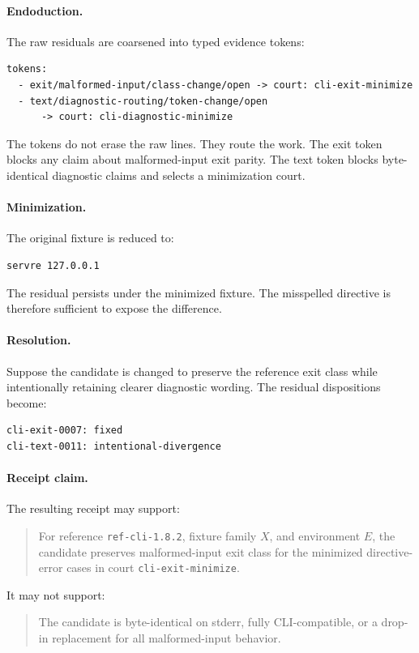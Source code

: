 \documentclass[11pt,a4paper]{article}
\begin{document}
\paragraph{Endoduction.}
The raw residuals are coarsened into typed evidence tokens:
\begin{verbatim}
tokens:
  - exit/malformed-input/class-change/open -> court: cli-exit-minimize
  - text/diagnostic-routing/token-change/open
      -> court: cli-diagnostic-minimize
\end{verbatim}
The tokens do not erase the raw lines. They route the work. The exit token blocks any claim about malformed-input exit parity. The text token blocks byte-identical diagnostic claims and selects a minimization court.

\paragraph{Minimization.}
The original fixture is reduced to:
\begin{verbatim}
servre 127.0.0.1
\end{verbatim}
The residual persists under the minimized fixture. The misspelled directive is therefore sufficient to expose the difference.

\paragraph{Resolution.}
Suppose the candidate is changed to preserve the reference exit class while intentionally retaining clearer diagnostic wording. The residual dispositions become:
\begin{verbatim}
cli-exit-0007: fixed
cli-text-0011: intentional-divergence
\end{verbatim}

\paragraph{Receipt claim.}
The resulting receipt may support:
\begin{quote}
For reference \texttt{ref-cli-1.8.2}, fixture family \(X\), and environment \(E\), the candidate preserves malformed-input exit class for the minimized directive-error cases in court \texttt{cli-exit-minimize}.
\end{quote}
It may not support:
\begin{quote}
The candidate is byte-identical on stderr, fully CLI-compatible, or a drop-in replacement for all malformed-input behavior.
\end{quote}
\end{document}

